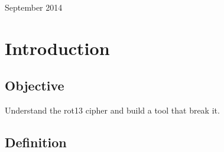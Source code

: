 \documentclass{article}
\begin{document}
\begin{titlepage}
\begin{center}
  \vspace{15 mm}


  {\large September 2014}\\[3cm] %




  \vfill %
  \end{center}
  \end{titlepage}



  \section{Introduction}

  \subsection{Objective}

  Understand the rot13 cipher and build a tool that break it.

  \subsection{Definition}
\end{document}

